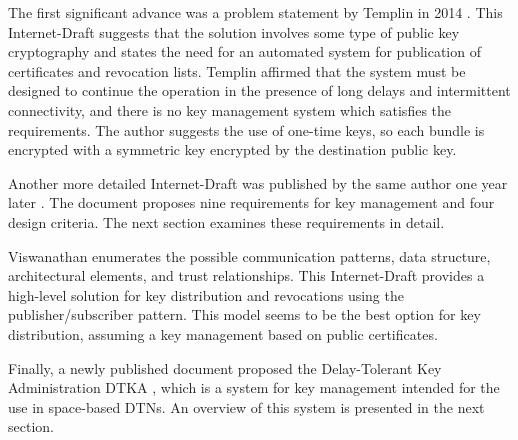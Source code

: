 The first significant advance was a problem statement by Templin in 2014  \cite{templin-dtnskmps-00}. This Internet-Draft suggests that the solution involves some type of public key cryptography and states the need for an automated system for publication of certificates and revocation lists. Templin affirmed that the system must be designed to continue the operation in the presence of long delays and intermittent connectivity, and there is no key management system which satisfies the requirements. The author suggests the use of one-time keys, so each bundle is encrypted with a symmetric key encrypted by the destination public key.  

Another more detailed Internet-Draft was published by the same author one year later \cite{templin-dtnskmreq-00}. The document proposes nine requirements for key management and four design criteria. The next section examines these requirements in detail.

Viswanathan \cite{viswanathan-dtn-pkdn-00} enumerates the possible communication patterns, data structure, architectural elements, and trust relationships.  This Internet-Draft provides a high-level solution for key distribution and revocations using the publisher/subscriber pattern. This model seems to be the best option for key distribution, assuming a key management based on public certificates. 

Finally, a newly published document proposed the Delay-Tolerant Key Administration DTKA \cite{burleigh-dtnwg-dtka-01}, which is a system for key management intended for the use in space-based DTNs. An overview of this system is presented in the next section.









